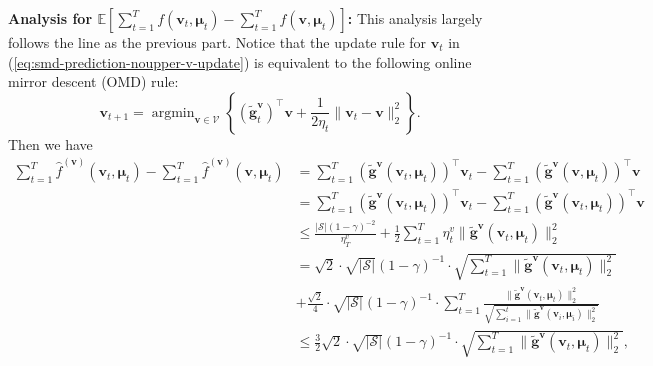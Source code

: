 \documentclass[12pt]{article}
\begin{document}
\textbf{Analysis for $\mathbb{E}\left [ \sum_{t=1}^T f(\boldsymbol{v}_t,\boldsymbol{\mu}_t)- \sum_{t=1}^T f(\boldsymbol{v},\boldsymbol{\mu}_t) \right]$:} This analysis largely follows the line as the previous part. Notice that the update rule for $\boldsymbol{v}_t$ in (\ref{eq:smd-prediction-noupper-v-update}) is equivalent to the following online mirror descent (OMD) rule:
\begin{equation*}
    \boldsymbol{v}_{t+1}  = \mathop{\arg\min}_{\boldsymbol{v} \in \mathcal{V}} \left \{ (\tilde{\boldsymbol{g}}^{\boldsymbol{v}}_t)^{\top} \boldsymbol{v} + \frac{1}{2 \eta_t} \|\boldsymbol{v}_t - \boldsymbol{v}\|_2^2 \right \}.
\end{equation*}
Then we have
\begin{align*}
    \sum_{t=1}^T \hat{f}^{(\boldsymbol{v})}(\boldsymbol{v}_t,\boldsymbol{\mu}_t)- \sum_{t=1}^T \hat{f}^{(\boldsymbol{v})}(\boldsymbol{v},\boldsymbol{\mu}_t) & = \sum_{t=1}^T (\tilde{\boldsymbol{g}}^{\boldsymbol{v}}(\boldsymbol{v}_t,\boldsymbol{\mu}_t))^{\top} \boldsymbol{v}_t - \sum_{t=1}^T (\tilde{\boldsymbol{g}}^{\boldsymbol{v}}(\boldsymbol{v},\boldsymbol{\mu}_t))^{\top} \boldsymbol{v} \\
    & = \sum_{t=1}^T (\tilde{\boldsymbol{g}}^{\boldsymbol{v}}(\boldsymbol{v}_t,\boldsymbol{\mu}_t))^{\top} \boldsymbol{v}_t - \sum_{t=1}^T (\tilde{\boldsymbol{g}}^{\boldsymbol{v}}(\boldsymbol{v}_t,\boldsymbol{\mu}_t))^{\top} \boldsymbol{v} \\
    & \le \frac{|\mathcal{S}|(1-\gamma)^{-2}}{\eta_T^v} + \frac{1}{2} \sum_{t=1}^T \eta_t^v \|\tilde{\boldsymbol{g}}^{\boldsymbol{v}}(\boldsymbol{v}_t,\boldsymbol{\mu}_t)\|_2^2 \\
    & = \sqrt{2} \cdot \sqrt{|\mathcal{S}|} (1-\gamma)^{-1} \cdot \sqrt{\sum_{t=1}^T\|\tilde{\boldsymbol{g}}^{\boldsymbol{v}}(\boldsymbol{v}_t,\boldsymbol{\mu}_t)\|_2^2} \\
    & + \frac{\sqrt{2}}{4} \cdot  \sqrt{|\mathcal{S}|} (1-\gamma)^{-1} \cdot \sum_{t=1}^T \frac{\|\tilde{\boldsymbol{g}}^{\boldsymbol{v}}(\boldsymbol{v}_t,\boldsymbol{\mu}_t)\|_2^2}{\sqrt{\sum_{i=1}^t \|\tilde{\boldsymbol{g}}^{\boldsymbol{v}}(\boldsymbol{v}_i,\boldsymbol{\mu}_i)\|_2^2}} \\
    & \le \frac{3}{2} \sqrt{2} \cdot \sqrt{|\mathcal{S}|} (1-\gamma)^{-1} \cdot \sqrt{\sum_{t=1}^T\|\tilde{\boldsymbol{g}}^{\boldsymbol{v}}(\boldsymbol{v}_t,\boldsymbol{\mu}_t)\|_2^2},
\end{align*}
\end{document}
